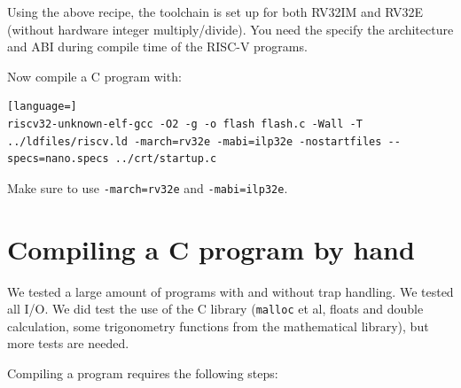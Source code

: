 \documentclass[12pt]{article}
\begin{document}
Using the above recipe, the toolchain is set up for both RV32IM and RV32E (without hardware integer multiply/divide). You need the specify the architecture and ABI during compile time of the RISC-V programs.

Now compile a C program with:

\begin{lstlisting}[language=]
riscv32-unknown-elf-gcc -O2 -g -o flash flash.c -Wall -T ../ldfiles/riscv.ld -march=rv32e -mabi=ilp32e -nostartfiles --specs=nano.specs ../crt/startup.c
\end{lstlisting}

Make sure to use \lstinline|-march=rv32e| and \lstinline|-mabi=ilp32e|.


\section{Compiling a C program by hand}
We tested a large amount of programs with and without trap handling. We tested all I/O. We did test the use of the C library (\lstinline|malloc| et al, floats and double calculation, some trigonometry functions from the mathematical library), but more tests are needed.

Compiling a program requires the following steps:
\end{document}
